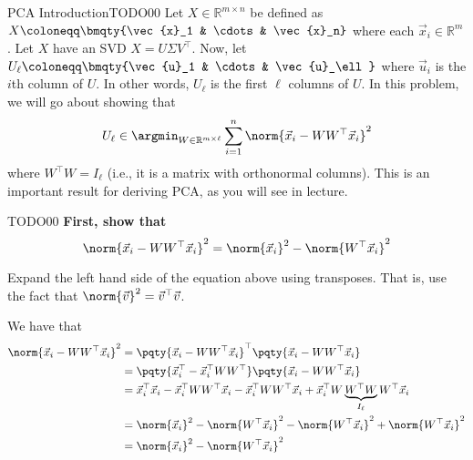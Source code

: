 \begin{problem}{PCA Introduction}{TODO}{0}{0}
    Let $X \in \mathbb{R}^{m \times n}$ be defined as $X \coloneqq \bmqty{\vec{x}_1 & \cdots & \vec{x}_n}$ where each $\vec{x}_i \in \mathbb{R}^m$. Let $X$ have an SVD $X = U \Sigma V^\top$. Now, let $U_\ell \coloneqq \bmqty{\vec{u}_1 & \cdots & \vec{u}_\ell}$ where $\vec{u}_i$ is the $i$th column of $U$. In other words, $U_\ell$ is the first $\ell$ columns of $U$. In this problem, we will go about showing that
    \begin{equation}
        U_\ell \in \argmin_{W \in \mathbb{R}^{m \times \ell}} \sum_{i = 1}^n \norm{\vec{x}_i - W W^\top \vec{x}_i}^2
    \end{equation}
    where $W^\top W = I_\ell$ (i.e., it is a matrix with orthonormal columns). This is an important result for deriving PCA, as you will see in lecture.

    \begin{problempartlist}
        \begin{problempart}{TODO}{0}{0}
            \textbf{First, show that
            \begin{equation}
                \norm{\vec{x}_i - W W^\top \vec{x}_i}^2 = \norm{\vec{x}_i}^2 - \norm{W^\top \vec{x}_i}^2
            \end{equation}}
            \begin{hint}
                Expand the left hand side of the equation above using transposes. That is, use the fact that $\norm{\vec{v}}^2 = \vec{v}^\top \vec{v}$.
            \end{hint}
        \end{problempart}

        \begin{solution}{0in}
            We have that
            \begin{align}
                \norm{\vec{x}_i - W W^\top \vec{x}_i}^2 &= \pqty{\vec{x}_i - W W^\top \vec{x}_i}^\top \pqty{\vec{x}_i - W W^\top \vec{x}_i} \\
                &= \pqty{\vec{x}_i^\top - \vec{x}_i^\top W W^\top} \pqty{\vec{x}_i - W W^\top \vec{x}_i} \\
                &= \vec{x}_i^\top \vec{x}_i - \vec{x}_i^\top W W^\top \vec{x}_i - \vec{x}_i^\top W W^\top \vec{x}_i +  \vec{x}_i^\top W \underbrace{W^\top W}_{I_\ell} W^\top \vec{x}_i \\
                &= \norm{\vec{x}_i}^2 - \norm{W^\top \vec{x}_i}^2 - \norm{W^\top \vec{x}_i}^2 + \norm{W^\top \vec{x}_i}^2 \\
                &= \norm{\vec{x}_i}^2 - \norm{W^\top \vec{x}_i}^2
            \end{align}
        \end{solution}


\end{problempartlist}
\end{problem}
